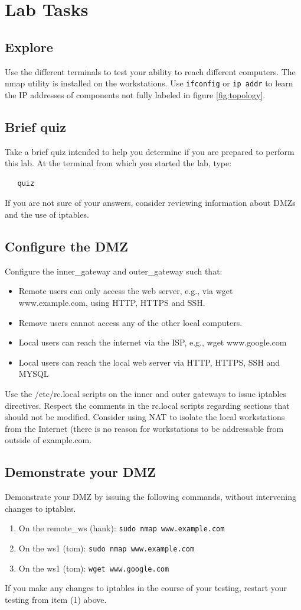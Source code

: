 \section{Lab Tasks}
\subsection{Explore}
Use the different terminals to test your ability to reach different computers.
The nmap utility is installed on the workstations.  Use {\tt ifconfig} or {\tt ip addr} to
learn the IP addresses of components not fully labeled in figure \ref{fig:topology}.
\subsection{Brief quiz}
Take a brief quiz intended to help you determine if you are prepared to perform this lab.  At
the terminal from which you started the lab, type:
\begin{verbatim}
   quiz 
\end{verbatim}
\noindent If you are not sure of your answers, consider reviewing information about DMZs and
the use of iptables.

\subsection{Configure the DMZ}
Configure the inner\_gateway and outer\_gateway such that:
\begin{itemize}
\item Remote users can only access the web server, e.g., via wget www.example.com, using
HTTP, HTTPS and SSH.
\item Remove users cannot access any of the other local computers.
\item Local users can reach the internet via the ISP, e.g., wget www.google.com
\item Local users can reach the local web server via HTTP, HTTPS, SSH and MYSQL
\end{itemize}

Use the /etc/rc.local scripts on the inner and outer gateways to issue iptables directives.
Respect the comments in the rc.local scripts regarding sections that should not be modified.
Consider using NAT to isolate the local workstations from the Internet (there is no reason
for workstations to be addressable from outside of example.com.

\subsection{Demonstrate your DMZ}
Demonstrate your DMZ by issuing the following commands, without intervening changes to iptables.
\begin{enumerate}
\item On the remote\_ws (hank): {\tt sudo nmap www.example.com}
\item On the ws1 (tom): {\tt sudo nmap www.example.com}
\item On the ws1 (tom): {\tt wget www.google.com}
\end{enumerate}
\noindent If you make any changes to iptables in the course of your testing, restart your testing from
item (1) above.


